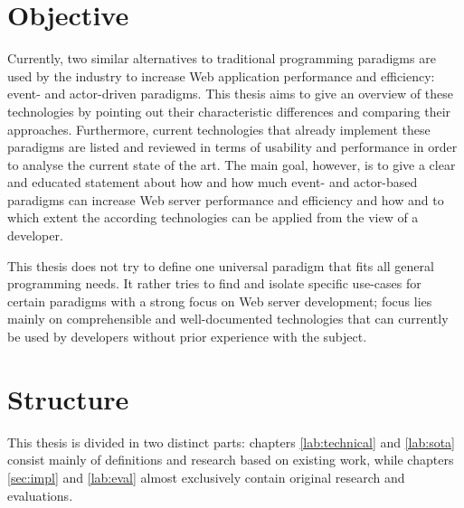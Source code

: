 \section{Objective}
Currently, two similar alternatives to traditional programming paradigms are used by the industry to increase Web application performance and efficiency: event- and actor-driven paradigms. This thesis aims to give an overview of these technologies by pointing out their characteristic differences and comparing their approaches. Furthermore, current technologies that already implement these paradigms are listed and reviewed in terms of usability and performance in order to analyse the current state of the art. The main goal, however, is to give a clear and educated statement about how and how much event- and actor-based paradigms can increase Web server performance and efficiency and how and to which extent the according technologies can be applied from the view of a developer.

This thesis does not try to define one universal paradigm that fits all general programming needs. It rather tries to find and isolate specific use-cases for certain paradigms with a strong focus on Web server development; focus lies mainly on comprehensible and well-documented technologies that can currently be used by developers without prior experience with the subject.

\section{Structure}
This thesis is divided in two distinct parts: chapters \ref{lab:technical} and \ref{lab:sota} consist mainly of definitions and research based on existing work, while chapters \ref{sec:impl} and \ref{lab:eval} almost exclusively contain original research and evaluations.

